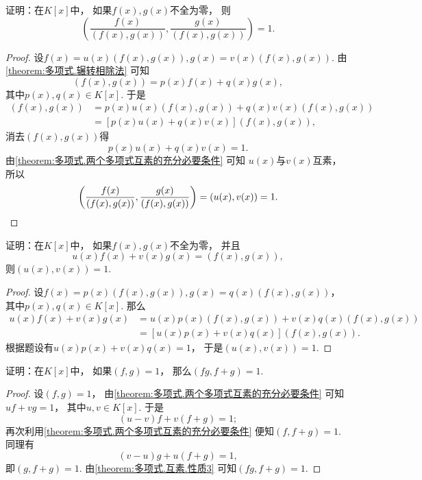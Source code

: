 \begin{example}\label{example:最大公因式.最大公因式除多项式的商式互素}
证明：在\(K[x]\)中，
如果\(f(x),g(x)\)不全为零，
则\[
	\left(
		\frac{f(x)}{(f(x),g(x))},
		\frac{g(x)}{(f(x),g(x))}
	\right)=1.
\]
\begin{proof}
设\(f(x) = u(x) (f(x),g(x)),
g(x) = v(x) (f(x),g(x))\).
由\cref{theorem:多项式.辗转相除法} 可知\[
	(f(x),g(x)) = p(x) f(x) + q(x) g(x),
\]
其中\(p(x),q(x) \in K[x]\).
于是\begin{align*}
	(f(x),g(x))
	&= p(x) u(x) (f(x),g(x)) + q(x) v(x) (f(x),g(x)) \\
	&= [p(x) u(x) + q(x) v(x)] (f(x),g(x)),
\end{align*}
消去\((f(x),g(x))\)得\[
	p(x) u(x) + q(x) v(x) = 1.
\]
由\cref{theorem:多项式.两个多项式互素的充分必要条件} 可知
\(u(x)\)与\(v(x)\)互素，
所以\[
	\left(
		\frac{f(x)}{(f(x),g(x))},
		\frac{g(x)}{(f(x),g(x))}
	\right)
	= (u(x),v(x))
	= 1.
	\qedhere
\]
\end{proof}
\end{example}

\begin{example}
证明：在\(K[x]\)中，
如果\(f(x),g(x)\)不全为零，
并且\[
	u(x) f(x) + v(x) g(x) = (f(x),g(x)),
\]
则\((u(x),v(x))=1\).
\begin{proof}
设\(f(x) = p(x) (f(x),g(x)),
g(x) = q(x) (f(x),g(x))\)，
其中\(p(x),q(x) \in K[x]\).
那么\begin{align*}
	u(x) f(x) + v(x) g(x)
	&= u(x) p(x) (f(x),g(x))
	+ v(x) q(x) (f(x),g(x)) \\
	&= [u(x) p(x) + v(x) q(x)] (f(x),g(x)).
\end{align*}
根据题设有\(u(x) p(x) + v(x) q(x) = 1\)，
于是\((u(x),v(x)) = 1\).
\end{proof}
\end{example}

\begin{example}
证明：在\(K[x]\)中，
如果\((f,g)=1\)，
那么\((fg,f+g)=1\).
\begin{proof}
设\((f,g)=1\)，
由\cref{theorem:多项式.两个多项式互素的充分必要条件}
可知\(uf+vg=1\)，
其中\(u,v \in K[x]\).
于是\[
	(u-v)f+v(f+g)=1;
\]
再次利用\cref{theorem:多项式.两个多项式互素的充分必要条件}
便知\((f,f+g)=1\).
同理有\[
	(v-u)g+u(f+g)=1,
\]
即\((g,f+g)=1\).
由\cref{theorem:多项式.互素.性质3}
可知\((fg,f+g)=1\).
\end{proof}
\end{example}

